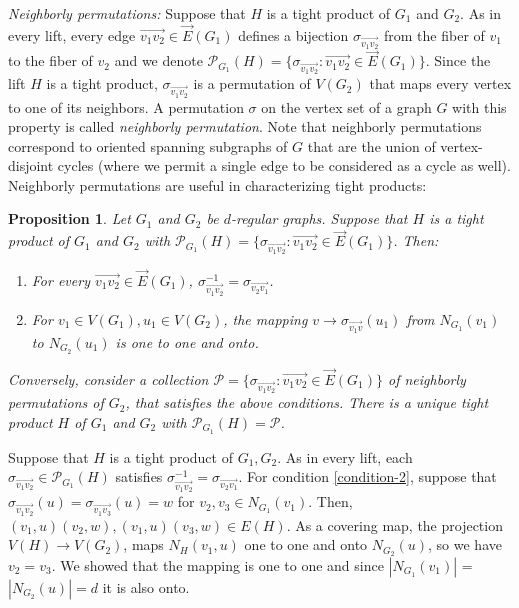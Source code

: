 \documentclass[12pt]{article}
\newtheorem{proposition}[theorem]{Proposition}
\newtheorem{open question}[theorem]{Open question}
\newcommand{\proof}{{\par\noindent {\bf Proof}\space\space}}
\begin{document}
{\em Neighborly permutations:} Suppose that $H$ is a tight product of $G_1$ and $G_2$. As in every lift, every edge $\overrightarrow{v_1v_2}\in \vec E(G_1)$ defines a bijection $\sigma_{\overrightarrow{v_1v_2}}$ from the fiber of $v_1$ to the fiber of $v_2$ and we denote $\mathscr{P}_{G_1}(H)=\{\sigma_{\overrightarrow{v_1v_2}}:\overrightarrow{v_1v_2}\in \vec E(G_1)\}$. Since the lift $H$ is a tight product, $\sigma_{\overrightarrow{v_1v_2}}$ is a permutation of $V(G_2)$ that maps every vertex to one of its neighbors. A permutation $\sigma$ on the vertex set of a graph $G$ with this property is called {\em neighborly permutation}. Note that neighborly permutations correspond to oriented spanning subgraphs of $G$ that are the union of vertex-disjoint cycles (where we permit a single edge to be considered as a cycle as well).\\
Neighborly permutations are useful in characterizing tight products:

\begin{proposition}\label{pro:tight-product-def-via-neighborly-permutation}
Let $G_1$ and $G_2$ be $d$-regular graphs. Suppose that $H$ is a tight product of $G_1$ and $G_2$ with $\mathscr{P}_{G_1}(H)=\{\sigma_{\overrightarrow{v_1v_2}}:\overrightarrow{v_1v_2}\in \vec E(G_1)\}$. Then:
\begin{enumerate}
\item For every $\overrightarrow{v_1v_2}\in \vec E(G_1)$, $\sigma_{\overrightarrow{v_1v_2}}^{-1}=\sigma_{\overrightarrow{v_2v_1}}$.
\item For $v_1 \in V(G_1),u_1 \in V(G_2)$, the mapping $v\rightarrow \sigma_{\overrightarrow{v_1v}}(u_1)$ from $N_{G_1}(v_1)$ to $N_{G_2}(u_1)$ is one to one and onto.\label{condition-2}
\end{enumerate}
Conversely, consider a collection $\mathscr{P}=\{\sigma_{\overrightarrow{v_1v_2}}:\overrightarrow{v_1v_2}\in \vec E(G_1)\}$ of neighborly permutations of $G_2$, that satisfies the above conditions. There is a unique tight product $H$ of $G_1$ and $G_2$ with $\mathscr{P}_{G_1}(H)=\mathscr{P}$.
\end{proposition}
\proof
Suppose that $H$ is a tight product of $G_1,G_2$. As in every lift, each $\sigma_{\overrightarrow{v_1v_2}}\in\mathscr{P}_{G_1}(H)$ satisfies $\sigma_{\overrightarrow{v_1v_2}}^{-1}=\sigma_{\overrightarrow{v_2v_1}}$. For condition \ref{condition-2}, suppose that $\sigma_{\overrightarrow{v_1v_2}}(u)= \sigma_{\overrightarrow{v_1v_3}}(u)=w$ for $v_2,v_3 \in N_{G_1}(v_1)$. Then, $(v_1,u)(v_2,w),(v_1,u)(v_3,w)\in E(H)$. As a covering map, the projection $V(H)\rightarrow V(G_2)$, maps $N_H(v_1,u)$ one to one and onto $N_{G_2}(u)$, so we have $v_2=v_3$. We showed that the mapping is one to one and since $|N_{G_1}(v_1)|$ = $|N_{G_2}(u)| = d$ it is also onto.
\end{document}
